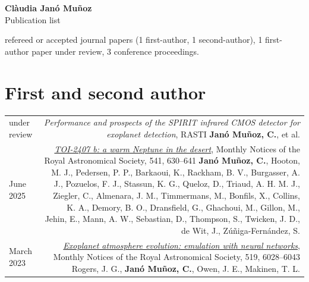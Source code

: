 \documentclass{article}
\newcommand{\me}{\textbf{Janó Muñoz, C.}}
\newcommand{\authlist}[1]{{\footnotesize #1}}
\begin{document}
\begin{center}
\huge
\textbf{Clàudia Janó Muñoz} \\
\large
Publication list\\
\end{center}

 refereed or accepted journal papers (1 first-author, 1 second-author), 1 first-author paper under review, 3 conference proceedings. %

\section*{First and second author}
\begin{tabular}{L!{\vrule}R}
    under review &
    \textit{Performance and prospects of the SPIRIT infrared CMOS detector for exoplanet detection}, RASTI \newline
    \authlist{\me, et al.} \\ %

    June 2025 &
    \href{https://ui.adsabs.harvard.edu/abs/2025MNRAS.541..630J/abstract}{\textit{TOI-2407 b: a warm Neptune in the desert}},
    Monthly Notices of the Royal Astronomical Society, 541, 630--641 \newline
    \authlist{\me, Hooton, M. J., Pedersen, P. P., Barkaoui, K., Rackham, B. V., Burgasser, A. J., Pozuelos, F. J., Stassun, K. G., Queloz, D., Triaud, A. H. M. J., Ziegler, C., Almenara, J. M., Timmermans, M., Bonfils, X., Collins, K. A., Demory, B. O., Dransfield, G., Ghachoui, M., Gillon, M., Jehin, E., Mann, A. W., Sebastian, D., Thompson, S., Twicken, J. D., de Wit, J., Zúñiga-Fernández, S.} \\

    March 2023 &
    \href{https://ui.adsabs.harvard.edu/abs/2023MNRAS.519.6028R/abstract}{\textit{Exoplanet atmosphere evolution: emulation with neural networks}},
    Monthly Notices of the Royal Astronomical Society, 519, 6028--6043 \newline
    \authlist{Rogers, J. G., \me, Owen, J. E., Makinen, T. L.} \\
\end{tabular}
\end{document}
